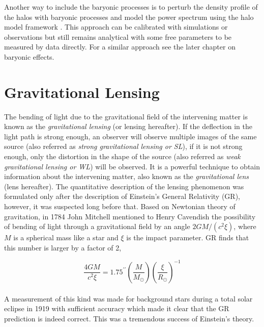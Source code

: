\documentclass[
  11pt,
  twoside,
  openright,
  titlepage,
  headings=optiontoheadandtoc
]{scrbook}
\begin{document}
Another way to include the baryonic processes is to perturb the density profile 
of the halos with baryonic processes and model the power spectrum using the halo model framework 
\cite{2014arXiv1410.6826M}.  This approach can 
be calibrated with simulations or observations but still remains analytical with some 
free parameters to be measured by data directly. 
For a similar approach see the later chapter on baryonic effects.



\clearpage
\section{Gravitational Lensing}
The bending of light due to the gravitational field of the intervening matter is known as
the {\it gravitational lensing} (or lensing hereafter). If the deflection in the light
path is strong enough, an observer will observe multiple images of the same source 
(also referred as {\it strong gravitational lensing or SL}), 
if it is not strong enough, only the distortion in the shape of the source  
(also referred as {\it weak gravitational lensing or WL}) will be observed. It is a powerful technique to 
obtain information about the intervening matter, also known as the {\it gravitational
lens} (lens hereafter). The quantitative description of the lensing phenomenon
was formulated only after the description of Einstein's General Relativity (GR), however,
it was suspected long before that. Based on Newtonian theory of gravitation, in 1784 
John Mitchell mentioned to Henry Cavendish the possibility of bending of light
through a gravitational field by an angle $ 2GM/(c^2 \xi)$, where $M$ is a spherical
mass like a star and $\xi$ is the impact parameter. GR finds that this number is larger 
by a factor of 2,

\begin{equation}
	\dfrac{4GM}{c^2 \xi} = 1.75^{\prime \prime} 
					\left(\dfrac{M}{M_{\odot}}\right)
					\left(\dfrac{\xi}{R_{\odot}} \right)^{-1}
\end{equation}
\\
A measurement of this kind was made for background stars during a total solar eclipse
in 1919 with sufficient accuracy which made it clear that the GR prediction is indeed
correct. This was a tremendous success of Einstein's theory. 
\end{document}
